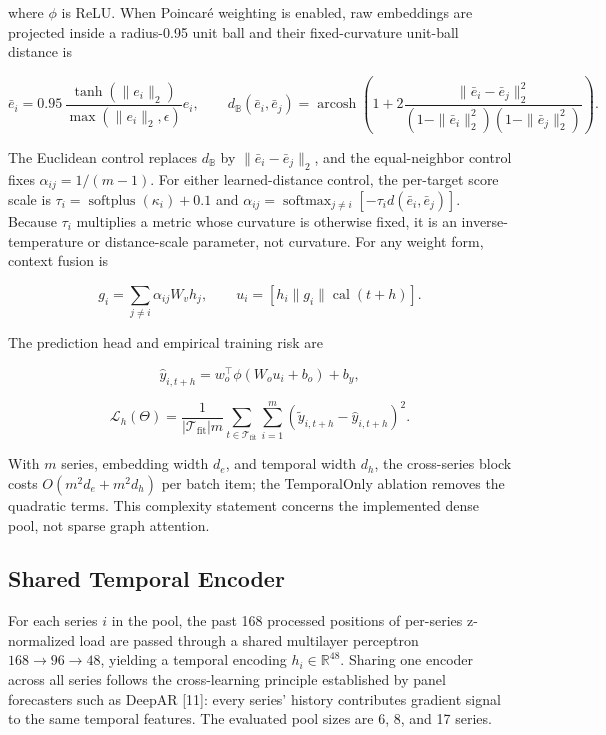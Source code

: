 \documentclass[electronics,article,submit,moreauthors]{Definitions/mdpi}
\begin{document}
where \(\phi\) is ReLU. When Poincar\'{e} weighting is enabled, raw embeddings are projected inside a radius-0.95 unit ball and their fixed-curvature unit-ball distance is

\[
\bar e_i=0.95\,\frac{\tanh(\|e_i\|_2)}{\max(\|e_i\|_2,\epsilon)}e_i,\qquad
d_{\mathbb B}(\bar e_i,\bar e_j)=
\operatorname{arcosh}\!\left(1+
2\frac{\|\bar e_i-\bar e_j\|_2^2}
{(1-\|\bar e_i\|_2^2)(1-\|\bar e_j\|_2^2)}\right).
\]

The Euclidean control replaces \(d_{\mathbb B}\) by \(\|\bar e_i-\bar e_j\|_2\), and the equal-neighbor control fixes \(\alpha_{ij}=1/(m-1)\). For either learned-distance control, the per-target score scale is \(\tau_i=\operatorname{softplus}(\kappa_i)+0.1\) and \(\alpha_{ij}=\operatorname{softmax}_{j\ne i}[-\tau_i d(\bar e_i,\bar e_j)]\). Because \(\tau_i\) multiplies a metric whose curvature is otherwise fixed, it is an inverse-temperature or distance-scale parameter, not curvature. For any weight form, context fusion is

\[
g_i=\sum_{j\ne i}\alpha_{ij}W_vh_j,\qquad
u_i=[h_i\|g_i\|\operatorname{cal}(t+h)] .
\]

The prediction head and empirical training risk are

\[
\hat y_{i,t+h}=w_o^\top\phi(W_ou_i+b_o)+b_y,
\]

\[
\mathcal L_h(\Theta)=\frac{1}{|\mathcal T_{\mathrm{fit}}|m}
\sum_{t\in\mathcal T_{\mathrm{fit}}}\sum_{i=1}^{m}
\left(\tilde y_{i,t+h}-\hat y_{i,t+h}\right)^2 .
\]

With \(m\) series, embedding width \(d_e\), and temporal width \(d_h\), the cross-series block costs \(O(m^2d_e+m^2d_h)\) per batch item; the TemporalOnly ablation removes the quadratic terms. This complexity statement concerns the implemented dense pool, not sparse graph attention.

\subsection{Shared Temporal Encoder}\label{shared-temporal-encoder}

For each series \(i\) in the pool, the past 168 processed positions of per-series z-normalized load are passed through a shared multilayer perceptron \(168 \to 96 \to 48\), yielding a temporal encoding \(h_i \in \mathbb{R}^{48}\). Sharing one encoder across all series follows the cross-learning principle established by panel forecasters such as DeepAR {[}11{]}: every series' history contributes gradient signal to the same temporal features. The evaluated pool sizes are 6, 8, and 17 series.
\end{document}
